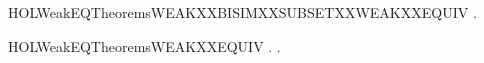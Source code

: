 \newcommand{\HOLWeakEQTheoremsWEAKXXBISIM}{\UseVerbatim{HOLWeakEQTheoremsWEAKXXBISIM}}
\begin{SaveVerbatim}{HOLWeakEQTheoremsWEAKXXBISIMXXSUBSETXXWEAKXXEQUIV}
\HOLTokenTurnstile{} \HOLSymConst{\HOLTokenForall{}}.   \HOLSymConst{\HOLTokenImp{}}   
\end{SaveVerbatim}
\newcommand{\HOLWeakEQTheoremsWEAKXXBISIMXXSUBSETXXWEAKXXEQUIV}{\UseVerbatim{HOLWeakEQTheoremsWEAKXXBISIMXXSUBSETXXWEAKXXEQUIV}}
\begin{SaveVerbatim}{HOLWeakEQTheoremsWEAKXXEQUIV}
\HOLTokenTurnstile{} \HOLSymConst{\HOLTokenForall{}} .    \HOLSymConst{\HOLTokenEquiv{}} \HOLSymConst{\HOLTokenExists{}}.    \HOLSymConst{\HOLTokenConj{}}  
\end{SaveVerbatim}
\newcommand{\HOLWeakEQTheoremsWEAKXXEQUIV}{\UseVerbatim{HOLWeakEQTheoremsWEAKXXEQUIV}}
